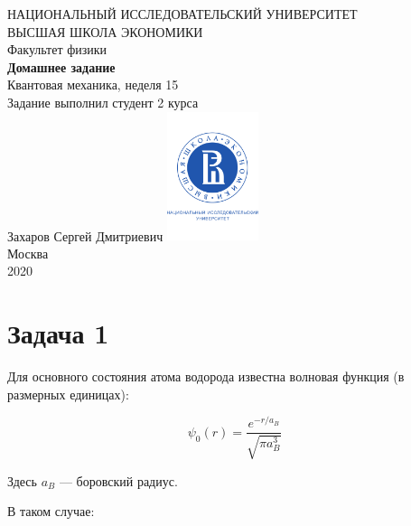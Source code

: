\documentclass[a4paper, 12pt]{article}
\begin{document}
	\begin{titlepage}
		\begin{center}
			$$$$
			$$$$
			$$$$
			$$$$
			{\Large{НАЦИОНАЛЬНЫЙ ИССЛЕДОВАТЕЛЬСКИЙ УНИВЕРСИТЕТ}}\\
			\vspace{0.1cm}
			{\Large{ВЫСШАЯ ШКОЛА ЭКОНОМИКИ}}\\
			\vspace{0.25cm}
			{\large{Факультет физики}}\\
			\vspace{5.5cm}
			{\Huge\textbf{{Домашнее задание}}}\\%
			\vspace{1cm}
			{\LARGE{Квантовая механика, неделя 15}}\\%
			\vspace{2cm}
			{Задание выполнил студент 2 курса}\\
			{Захаров Сергей Дмитриевич}
			\vfill
			\includegraphics[width = 0.2\textwidth]{HSElogo}\\
			\vfill
			Москва\\
			2020
		\end{center}
	\end{titlepage}

\section*{Задача 1}

Для основного состояния атома водорода известна волновая функция (в размерных единицах):

\begin{equation}
	\psi_0 (r) = \frac{e^{-r / a_B}}{\sqrt{\pi a^3_B}}
	\label{eq:psi_0}
\end{equation}

Здесь $a_B$ --- боровский радиус.

В таком случае:
\end{document}
